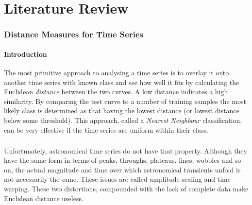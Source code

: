 


%

\chapter{Literature Review} \label{chap:litreview}


%

\subsection{Distance Measures for Time Series}
	\label{sec:distancemeasures}
	
	\subsubsection{Introduction}
	The most primitive approach to analysing a time series is to overlay it onto another time series with known class and see how well it fits by calculating the Euclidean \emph{distance} between the two curves. A low distance indicates a high similarity. By comparing the test curve to a number of training samples the most likely class is determined as that having the lowest distance (or lowest distance below some threshold). This approach, called a \emph{Nearest Neighbour} classification, can be very effective if the time series are uniform within their class. 
	\paragraph{}
	Unfortunately, astronomical time series do not have that property. Although they have the same form in terms of peaks, throughs, plateaus, lines, wobbles and so on, the actual magnitude and time over which astronomical transients unfold is not necessarily the same. These issues are called amplitude scaling and time warping. These two distortions, compounded with the lack of complete data make Euclidean distance useless. 
